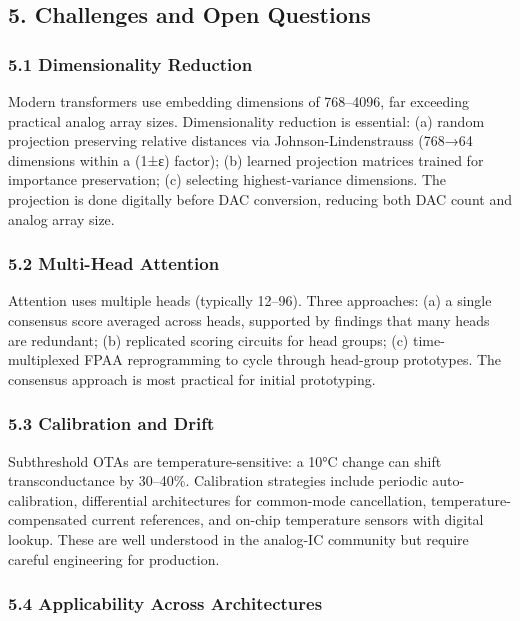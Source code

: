 \subsection{5. Challenges and Open
Questions}\label{challenges-and-open-questions}

\subsubsection{5.1 Dimensionality
Reduction}\label{dimensionality-reduction}

Modern transformers use embedding dimensions of 768--4096, far exceeding
practical analog array sizes. Dimensionality reduction is essential: (a)
random projection preserving relative distances via
Johnson-Lindenstrauss (768→64 dimensions within a (1±ε) factor); (b)
learned projection matrices trained for importance preservation; (c)
selecting highest-variance dimensions. The projection is done digitally
before DAC conversion, reducing both DAC count and analog array size.

\subsubsection{5.2 Multi-Head Attention}\label{multi-head-attention}

Attention uses multiple heads (typically 12--96). Three approaches: (a)
a single consensus score averaged across heads, supported by findings
that many heads are redundant; (b) replicated scoring circuits for head
groups; (c) time-multiplexed FPAA reprogramming to cycle through
head-group prototypes. The consensus approach is most practical for
initial prototyping.

\subsubsection{5.3 Calibration and Drift}\label{calibration-and-drift}

Subthreshold OTAs are temperature-sensitive: a 10°C change can shift
transconductance by 30--40\%. Calibration strategies include periodic
auto-calibration, differential architectures for common-mode
cancellation, temperature-compensated current references, and on-chip
temperature sensors with digital lookup. These are well understood in
the analog-IC community but require careful engineering for production.

\subsubsection{5.4 Applicability Across
Architectures}\label{applicability-across-architectures}

